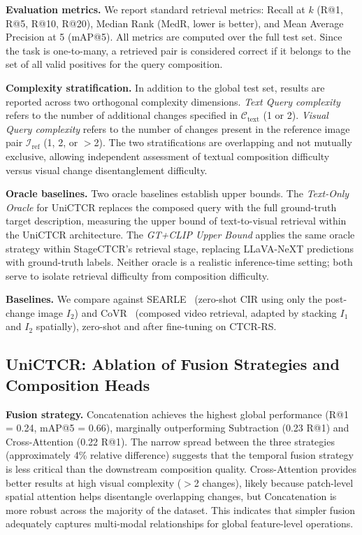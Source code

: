 \textbf{Evaluation metrics.} We report standard retrieval
metrics: Recall at $k$ (R@1, R@5, R@10, R@20), Median
Rank (MedR, lower is better), and Mean Average Precision
at 5 (mAP@5). All metrics are computed over the full test
set. Since the task is one-to-many, a retrieved pair is
considered correct if it belongs to the set of all valid
positives for the query composition.
 
\textbf{Complexity stratification.} In addition to the
global test set, results are reported across two orthogonal
complexity dimensions. \textit{Text Query complexity} refers
to the number of additional changes specified in
$\mathcal{C}_\text{text}$ (1 or 2). \textit{Visual Query
complexity} refers to the number of changes present in the
reference image pair $\mathcal{I}_\text{ref}$ (1, 2, or
$>$2). The two stratifications are overlapping and not
mutually exclusive, allowing independent assessment of
textual composition difficulty versus visual change
disentanglement difficulty.
 
\textbf{Oracle baselines.} Two oracle baselines establish
upper bounds. The \textit{Text-Only Oracle} for UniCTCR
replaces the composed query with the full ground-truth
target description, measuring the upper bound of
text-to-visual retrieval within the UniCTCR architecture.
The \textit{GT+CLIP Upper Bound} applies the same oracle
strategy within StageCTCR's retrieval stage, replacing
LLaVA-NeXT predictions with ground-truth labels. Neither
oracle is a realistic inference-time setting; both serve
to isolate retrieval difficulty from composition difficulty.
 
\textbf{Baselines.} We compare against SEARLE~\cite{baldrati2023zero}
(zero-shot CIR using only the post-change image $I_2$) and
CoVR~\cite{ventura2024covr} (composed video retrieval,
adapted by stacking $I_1$ and $I_2$ spatially),
zero-shot and after fine-tuning on CTCR-RS.
 
\subsection{UniCTCR: Ablation of Fusion Strategies and
Composition Heads}
\label{sec:chap7_unictr_results}
\textbf{Fusion strategy.} Concatenation achieves the
highest global performance (R@1 = 0.24, mAP@5 = 0.66),
marginally outperforming Subtraction (0.23 R@1) and
Cross-Attention (0.22 R@1). The narrow spread between the
three strategies (approximately 4\% relative difference)
suggests that the temporal fusion strategy is less critical
than the downstream composition quality. Cross-Attention
provides better results at high visual complexity ($>$2
changes), likely because patch-level spatial attention
helps disentangle overlapping changes, but Concatenation
is more robust across the majority of the dataset. This
indicates that simpler fusion adequately captures
multi-modal relationships for global feature-level
operations.
 
